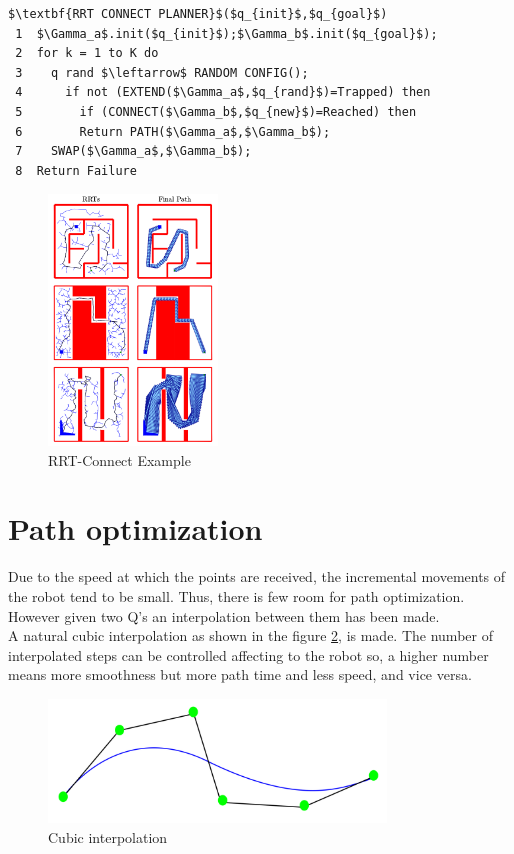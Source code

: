 \begin{lstlisting}[frame=tb, mathescape=true,xleftmargin=.13\textwidth, xrightmargin=.13\textwidth]
$\textbf{RRT CONNECT PLANNER}$($q_{init}$,$q_{goal}$)
 1  $\Gamma_a$.init($q_{init}$);$\Gamma_b$.init($q_{goal}$);
 2  for k = 1 to K do
 3    q rand $\leftarrow$ RANDOM CONFIG();
 4      if not (EXTEND($\Gamma_a$,$q_{rand}$)=Trapped) then
 5        if (CONNECT($\Gamma_b$,$q_{new}$)=Reached) then
 6        Return PATH($\Gamma_a$,$\Gamma_b$);
 7    SWAP($\Gamma_a$,$\Gamma_b$);
 8  Return Failure
\end{lstlisting}

\begin{figure}[!ht]
	\centering
	\includegraphics[width=0.4\textwidth]{figures/rrt_connect}
	\caption{RRT-Connect Example}
	\label{fig:rrt_connect}
\end{figure}



\section{Path optimization} %
\label{sec:path_optimization}
Due to the speed at which the points are received, the incremental movements of the robot tend to be small. Thus, there is few room for path optimization. However given two Q's an interpolation between them has been made.\\

A natural cubic interpolation as shown in the figure \ref{fig:cubic interpolation}, is made. The number of interpolated steps can be controlled affecting to the robot so, a higher number means more smoothness but more path time and less speed, and vice versa.

\begin{figure}[!hb]
	\centering
	\includegraphics[width=0.8\textwidth]{figures/cubic_interpolation}
	\caption{Cubic interpolation}
	\label{fig:cubic interpolation}
\end{figure}

